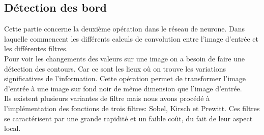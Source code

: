 \documentclass[a4paper,11pt]{report}
\theoremstyle{definition}
\begin{document}
\subsection{Détection des bord}
Cette partie concerne la deuxième opération dans le réseau de neurone. Dans laquelle commencent les différents calculs de convolution entre l’image d’entrée et les différentes filtres.\\
Pour voir les changements des valeurs sur une image on a besoin de faire une détection des contours. Car ce sont les lieux où on trouve les variations significatives de l'information. Cette opération permet de transformer l’image d’entrée à une image sur fond noir de même dimension que l'image d'entrée.\\
Ils existent plusieurs variantes de filtre mais nous avons procédé à l'implémentation des fonctions de trois filtres: Sobel, Kirsch et Prewitt. Ces filtres se caractérisent par une grande rapidité et un faible coût, du fait de leur aspect local. \\
  
\end{document}
